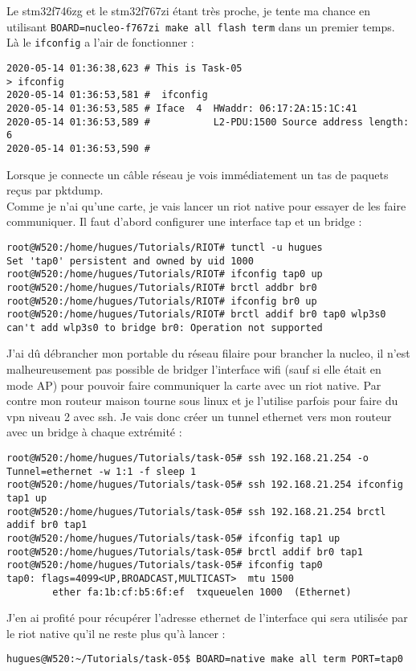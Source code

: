 Le stm32f746zg et le stm32f767zi étant très proche, je tente ma chance
en utilisant \texttt{BOARD=nucleo-f767zi make all flash term} dans un
premier temps. Là le \texttt{ifconfig} a l'air de fonctionner :
\begin{verbatim}
2020-05-14 01:36:38,623 # This is Task-05
> ifconfig
2020-05-14 01:36:53,581 #  ifconfig
2020-05-14 01:36:53,585 # Iface  4  HWaddr: 06:17:2A:15:1C:41 
2020-05-14 01:36:53,589 #           L2-PDU:1500 Source address length: 6
2020-05-14 01:36:53,590 #           
\end{verbatim}

Lorsque je connecte un câble réseau je vois immédiatement un tas de
paquets reçus par pktdump.\\

Comme je n'ai qu'une carte, je vais lancer un riot native pour essayer
de les faire communiquer. Il faut d'abord configurer une interface tap
et un bridge :
\begin{verbatim}
root@W520:/home/hugues/Tutorials/RIOT# tunctl -u hugues
Set 'tap0' persistent and owned by uid 1000
root@W520:/home/hugues/Tutorials/RIOT# ifconfig tap0 up
root@W520:/home/hugues/Tutorials/RIOT# brctl addbr br0
root@W520:/home/hugues/Tutorials/RIOT# ifconfig br0 up
root@W520:/home/hugues/Tutorials/RIOT# brctl addif br0 tap0 wlp3s0
can't add wlp3s0 to bridge br0: Operation not supported

\end{verbatim}

J'ai dû débrancher mon portable du réseau filaire pour brancher la
nucleo, il n'est malheureusement pas possible de bridger l'interface
wifi (sauf si elle était en mode AP) pour pouvoir faire communiquer la
carte avec un riot native. Par contre mon routeur maison tourne sous
linux et je l'utilise parfois pour faire du vpn niveau 2 avec ssh.
Je vais donc créer un tunnel ethernet vers mon routeur avec un bridge à
chaque extrémité :
{\scriptsize
\begin{verbatim}
root@W520:/home/hugues/Tutorials/task-05# ssh 192.168.21.254 -o Tunnel=ethernet -w 1:1 -f sleep 1
root@W520:/home/hugues/Tutorials/task-05# ssh 192.168.21.254 ifconfig tap1 up
root@W520:/home/hugues/Tutorials/task-05# ssh 192.168.21.254 brctl addif br0 tap1
root@W520:/home/hugues/Tutorials/task-05# ifconfig tap1 up
root@W520:/home/hugues/Tutorials/task-05# brctl addif br0 tap1
root@W520:/home/hugues/Tutorials/task-05# ifconfig tap0
tap0: flags=4099<UP,BROADCAST,MULTICAST>  mtu 1500
        ether fa:1b:cf:b5:6f:ef  txqueuelen 1000  (Ethernet)
\end{verbatim}
}
J'en ai profité pour récupérer l'adresse ethernet de l'interface qui
sera utilisée par le riot native qu'il ne reste plus qu'à lancer :
\begin{verbatim}
hugues@W520:~/Tutorials/task-05$ BOARD=native make all term PORT=tap0
\end{verbatim}

